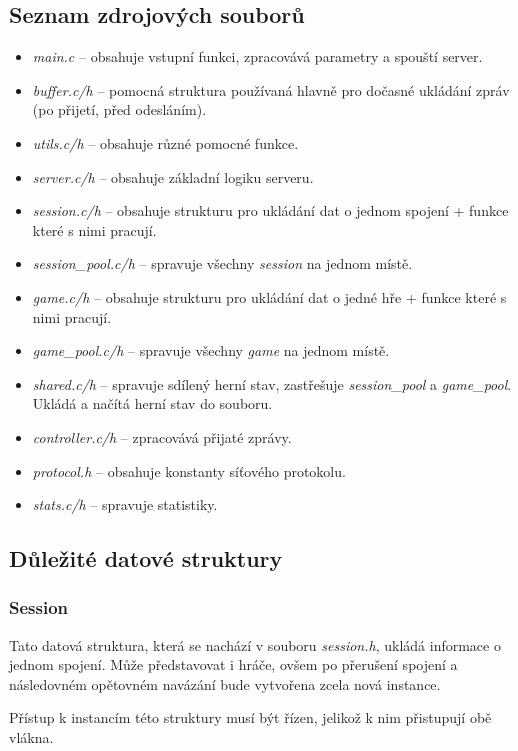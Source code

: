 \documentclass[12pt, a4paper]{report}
\begin{document}
\subsection{Seznam zdrojových souborů}
\begin{itemize}
	\item \emph{main.c} -- obsahuje vstupní funkci, zpracovává parametry a spouští server.
	\item \emph{buffer.c/h} -- pomocná struktura používaná hlavně pro dočasné ukládání zpráv (po přijetí, před odesláním).
	\item \emph{utils.c/h} -- obsahuje různé pomocné funkce.
	\item \emph{server.c/h} -- obsahuje základní logiku serveru.
	\item \emph{session.c/h} -- obsahuje strukturu pro ukládání dat o jednom spojení + funkce které s nimi pracují.
	\item \emph{session\_pool.c/h} -- spravuje všechny \emph{session} na jednom místě.
	\item \emph{game.c/h} -- obsahuje strukturu pro ukládání dat o jedné hře + funkce které s nimi pracují.
	\item \emph{game\_pool.c/h} -- spravuje všechny \emph{game} na jednom místě.
	\item \emph{shared.c/h} -- spravuje sdílený herní stav, zastřešuje \emph{session\_pool} a \emph{game\_pool}. Ukládá a načítá herní stav do souboru.
	\item \emph{controller.c/h} -- zpracovává přijaté zprávy.
	\item \emph{protocol.h} -- obsahuje konstanty síťového protokolu.
	\item \emph{stats.c/h} -- spravuje statistiky.
\end{itemize}

\subsection{Důležité datové struktury}

\subsubsection*{Session}
Tato datová struktura, která se nachází v souboru \emph{session.h}, ukládá informace o jednom spojení. Může představovat i hráče, ovšem po přerušení spojení a následovném opětovném navázání bude vytvořena zcela nová instance.

Přístup k instancím této struktury musí být řízen, jelikož k nim přistupují obě vlákna.
\end{document}
